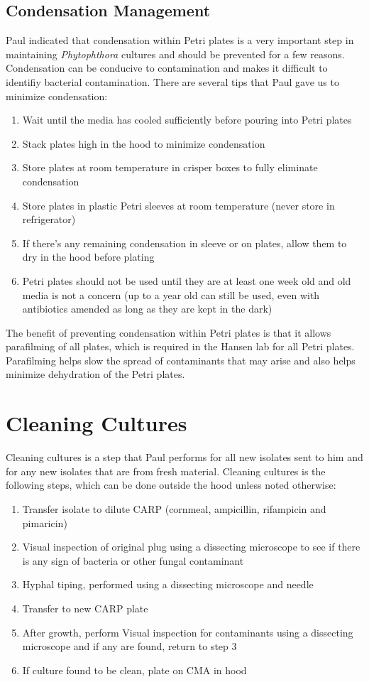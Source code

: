 \documentclass{article}\usepackage[]{graphicx}\usepackage[]{color}
\begin{document}
\subsection{Condensation Management}

Paul indicated that condensation within Petri plates is a very important step in maintaining \emph{Phytophthora} cultures and should be prevented for a few reasons.  Condensation can be conducive to contamination and makes it difficult to identifiy bacterial contamination. There are several tips that Paul gave us to minimize condensation:

\begin{enumerate}
  \item Wait until the media has cooled sufficiently before pouring into Petri plates
  \item Stack plates high in the hood to minimize condensation 
  \item Store plates at room temperature in crisper boxes to fully eliminate condensation
  \item Store plates in plastic Petri sleeves at room temperature (never store in refrigerator)
  \item If there's any remaining condensation in sleeve or on plates, allow them to dry in the hood before plating
  \item Petri plates should not be used until they are at least one week old and old media is not a concern (up to a year old can still be used, even with antibiotics amended as long as they are kept in the dark)
\end{enumerate}

The benefit of preventing condensation within Petri plates is that it allows parafilming of all plates, which is required in the Hansen lab for all Petri plates.  Parafilming helps slow the spread of contaminants that may arise and also helps minimize dehydration of the Petri plates.


\section{Cleaning Cultures}
Cleaning cultures is a step that Paul performs for all new isolates sent to him and for any new isolates that are from fresh material.  Cleaning cultures is the following steps, which can be done outside the hood unless noted otherwise:

\begin{enumerate}
  \item Transfer isolate to dilute CARP (cornmeal, ampicillin, rifampicin and pimaricin)
  \item Visual inspection of original plug using a dissecting microscope to see if there is any sign of bacteria or other fungal contaminant
  \item Hyphal tiping, performed using a dissecting microscope and needle
  \item Transfer to new CARP plate
  \item After growth, perform Visual inspection for contaminants using a dissecting microscope and if any are found, return to step 3
  \item If culture found to be clean, plate on CMA in hood
\end{enumerate}
\end{document}
